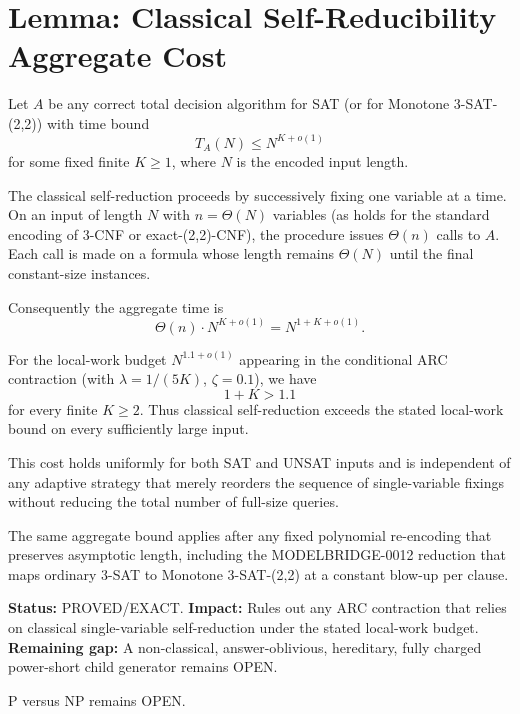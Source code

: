 
\section*{Lemma: Classical Self-Reducibility Aggregate Cost}
\label{lem:selfred-cost}

Let \( A \) be any correct total decision algorithm for SAT (or for Monotone 3-SAT-(2,2)) with time bound
\[
T_A(N) \le N^{K+o(1)}
\]
for some fixed finite \( K \ge 1 \), where \( N \) is the encoded input length.

The classical self-reduction proceeds by successively fixing one variable at a time.  On an input of length \( N \) with \( n = \Theta(N) \) variables (as holds for the standard encoding of 3-CNF or exact-(2,2)-CNF), the procedure issues \( \Theta(n) \) calls to \( A \).  Each call is made on a formula whose length remains \( \Theta(N) \) until the final constant-size instances.

Consequently the aggregate time is
\[
\Theta(n) \cdot N^{K+o(1)} = N^{1+K+o(1)}.
\]

For the local-work budget \( N^{1.1+o(1)} \) appearing in the conditional ARC contraction (with \( \lambda = 1/(5K) \), \( \zeta = 0.1 \)), we have
\[
1+K > 1.1
\]
for every finite \( K \ge 2 \).  Thus classical self-reduction exceeds the stated local-work bound on every sufficiently large input.

This cost holds uniformly for both SAT and UNSAT inputs and is independent of any adaptive strategy that merely reorders the sequence of single-variable fixings without reducing the total number of full-size queries.

The same aggregate bound applies after any fixed polynomial re-encoding that preserves asymptotic length, including the MODELBRIDGE-0012 reduction that maps ordinary 3-SAT to Monotone 3-SAT-(2,2) at a constant blow-up per clause.

\textbf{Status:} PROVED/EXACT.  
\textbf{Impact:} Rules out any ARC contraction that relies on classical single-variable self-reduction under the stated local-work budget.  
\textbf{Remaining gap:} A non-classical, answer-oblivious, hereditary, fully charged power-short child generator remains OPEN.

P versus NP remains OPEN.
